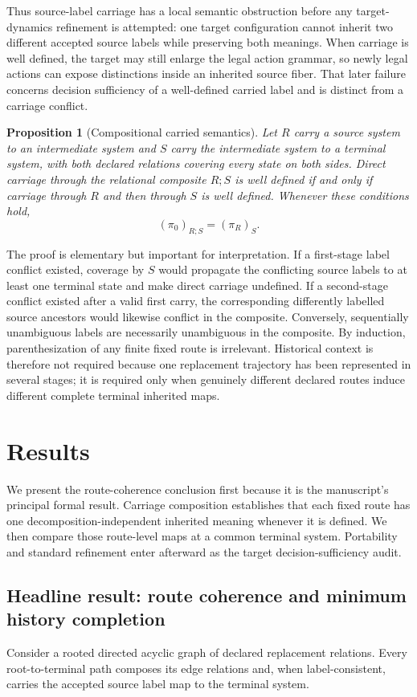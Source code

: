 \documentclass[11pt]{article}
\newtheorem{proposition}{Proposition}
\begin{document}
Thus source-label carriage has a local semantic obstruction before any target-dynamics refinement is attempted: one target configuration cannot inherit two different accepted source labels while preserving both meanings. When carriage is well defined, the target may still enlarge the legal action grammar, so newly legal actions can expose distinctions inside an inherited source fiber. That later failure concerns decision sufficiency of a well-defined carried label and is distinct from a carriage conflict.

\begin{proposition}[Compositional carried semantics]
Let $R$ carry a source system to an intermediate system and $S$ carry the intermediate system to a terminal system, with both declared relations covering every state on both sides. Direct carriage through the relational composite $R;S$ is well defined if and only if carriage through $R$ and then through $S$ is well defined. Whenever these conditions hold,
\[
\boxed{
(\pi_0)_{R;S}=(\pi_R)_S.
}
\]
\end{proposition}

The proof is elementary but important for interpretation. If a first-stage label conflict existed, coverage by $S$ would propagate the conflicting source labels to at least one terminal state and make direct carriage undefined. If a second-stage conflict existed after a valid first carry, the corresponding differently labelled source ancestors would likewise conflict in the composite. Conversely, sequentially unambiguous labels are necessarily unambiguous in the composite. By induction, parenthesization of any finite fixed route is irrelevant. Historical context is therefore not required because one replacement trajectory has been represented in several stages; it is required only when genuinely different declared routes induce different complete terminal inherited maps.

\section{Results}
We present the route-coherence conclusion first because it is the manuscript's principal formal result. Carriage composition establishes that each fixed route has one decomposition-independent inherited meaning whenever it is defined. We then compare those route-level maps at a common terminal system. Portability and standard refinement enter afterward as the target decision-sufficiency audit.

\subsection{Headline result: route coherence and minimum history completion}
Consider a rooted directed acyclic graph of declared replacement relations. Every root-to-terminal path composes its edge relations and, when label-consistent, carries the accepted source label map to the terminal system.
\end{document}
